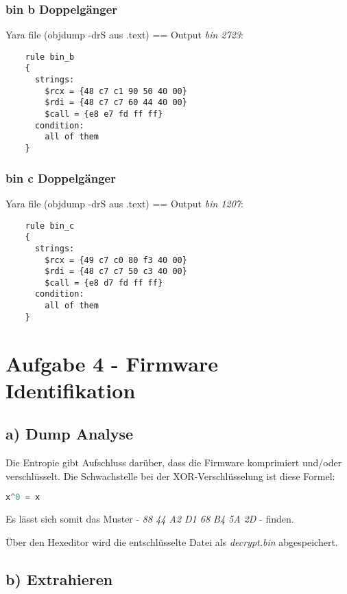 \subsubsection*{bin b Doppelgänger}

Yara file (objdump -drS aus .text) == Output \textit{bin 2723}:

\begin{lstlisting}
    rule bin_b
    {
      strings:
        $rcx = {48 c7 c1 90 50 40 00}
        $rdi = {48 c7 c7 60 44 40 00}
        $call = {e8 e7 fd ff ff}
      condition:
        all of them
    }
\end{lstlisting}

\subsubsection*{bin c Doppelgänger}

Yara file (objdump -drS aus .text) == Output \textit{bin 1207}:

\begin{lstlisting}
    rule bin_c
    {
      strings:
        $rcx = {49 c7 c0 80 f3 40 00}
        $rdi = {48 c7 c7 50 c3 40 00}
        $call = {e8 d7 fd ff ff}
      condition:
        all of them
    }

\end{lstlisting}

\section*{Aufgabe 4 - Firmware Identifikation}

\subsection*{a) Dump Analyse}

Die Entropie gibt Aufschluss darüber, dass die Firmware komprimiert und/oder verschlüsselt.
Die Schwachstelle bei der XOR-Verschlüsselung ist diese Formel:
\begin{lstlisting}[language=Python]
    x^0 = x
\end{lstlisting}

Es lässt sich somit das Muster - \textit{88 44 A2 D1 68 B4 5A 2D} - finden.

Über den Hexeditor wird die entschlüsselte Datei als \textit{decrypt.bin} abgespeichert.

\subsection*{b) Extrahieren}


